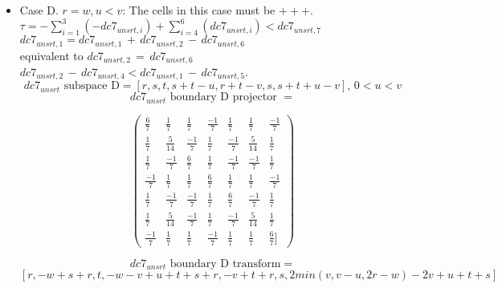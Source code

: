 \documentclass[preprint]{iucr}              %
\begin{document}
{\begin{itemize}
{    \[dc7_{unsrt} \text{ boundary C transform}=\]
    \[[r,-w+s+r,t,-w+v-u+t+s+r,-v+t+r,s,-u+t+s]\]
     }
     \item{Case D. $r=w, u < v$:  The cells in this case must be $+++$.\\
     $\tau=-\sum_{i=1}^3(-dc7_{unsrt,i})+\sum_{i=4}^6(dc7_{unsrt,i}) <
     dc7_{unsrt,7}$\\
     $dc7_{unsrt,1}=dc7_{unsrt,1}\,+\,dc7_{unsrt,2}\,-\,dc7_{unsrt,6}$\\
          equivalent to
     $dc7_{unsrt,2}\,=\,dc7_{unsrt,6}$\\
     $dc7_{unsrt,2}\,-\,dc7_{unsrt,4} <
     dc7_{unsrt,1}\,-\,dc7_{unsrt,5}$.
     \[dc7_{unsrt}\text{ subspace D} =[r,s,t,s+t-u,r+t-v,s,s+t+u-v],\, 0<u<v \]
     \[dc7_{unsrt} \text{ boundary D projector } =\]
\begin{center}
\begin{equation*}
\begin{pmatrix}
\frac{6}{7}&\frac{1}{7}&\frac{1}{7}&\frac{-1}{7}&\frac{1}{7}&\frac{1}{7}&\frac{-1}{7}\\[.25em]
\frac{1}{7}&\frac{5}{14}&\frac{-1}{7}&\frac{1}{7}&\frac{-1}{7}&\frac{5}{14}&\frac{1}{7}\\[.25em]
\frac{1}{7}&\frac{-1}{7}&\frac{6}{7}&\frac{1}{7}&\frac{-1}{7}&\frac{-1}{7}&\frac{1}{7}\\[.25em]
\frac{-1}{7}&\frac{1}{7}&\frac{1}{7}&\frac{6}{7}&\frac{1}{7}&\frac{1}{7}&\frac{-1}{7}\\[.25em]
\frac{1}{7}&\frac{-1}{7}&\frac{-1}{7}&\frac{1}{7}&\frac{6}{7}&\frac{-1}{7}&\frac{1}{7}\\[.25em]
\frac{1}{7}&\frac{5}{14}&\frac{-1}{7}&\frac{1}{7}&\frac{-1}{7}&\frac{5}{14}&\frac{1}{7}\\[.25em]
\frac{-1}{7}&\frac{1}{7}&\frac{1}{7}&\frac{-1}{7}&\frac{1}{7}&\frac{1}{7}&\frac{6}{7}]
\end{pmatrix}
\end{equation*}
\end{center}


    \[dc7_{unsrt} \text{ boundary D transform}=\]
    \[[r,-w+s+r,t,-w-v+u+t+s+r,-v+t+r,s,2min(v,v-u,2r-w)-2v+u+t+s]\]

}
\end{itemize}}
\end{document}
